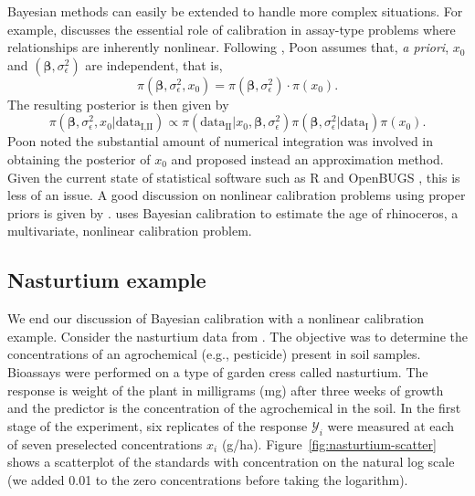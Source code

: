 \documentclass[cmfont,usenames,dvipsnames,leqno]{afit-etd}\usepackage[]{graphicx}\usepackage[]{color}
\newcommand{\mc}[1]{\ensuremath{\mathcal{#1}}}
\begin{document}
Bayesian methods can easily be extended to handle more complex situations. For example, \citet{racine-poon_bayesian_1988} discusses the essential role of calibration in assay-type problems where relationships are inherently nonlinear. Following \citet{hoadley_bayesian_1970}, Poon assumes that, \textit{a priori}, $x_0$ and $(\bm{\beta}, \sigma_\epsilon^2)$ are independent, that is,
\begin{equation*}
  \pi\left(\bm{\beta}, \sigma_\epsilon^2, x_0\right) = \pi\left(\bm{\beta}, \sigma_\epsilon^2\right) \cdot \pi\left(x_0\right).
\end{equation*}
The resulting posterior is then given by
\begin{equation*}
  \pi\left(\bm{\beta}, \sigma_\epsilon^2, x_0|\text{data}_{\text{I}, \text{II}}\right) \propto \pi\left(\text{data}_\text{II}|x_0, \bm{\beta}, \sigma_\epsilon^2\right)\pi\left(\bm{\beta}, \sigma_\epsilon^2|\text{data}_\text{I}\right)\pi\left(x_0\right).
\end{equation*}
Poon noted the substantial amount of numerical integration was involved in obtaining the posterior of $x_0$ and proposed instead an approximation method. Given the current state of statistical software such as R \citep{rprogram} and OpenBUGS \citep{lunn_bugs_2009}, this is less of an issue. A good discussion on nonlinear calibration problems using proper priors is given by \citet{hamada_bayesian_2003}. \citet{plessis_bayesian_1996} uses Bayesian calibration to estimate the age of rhinoceros, a multivariate, nonlinear calibration problem. 

\subsection{Nasturtium example}
\label{sec:nasturtium}
We end our discussion of Bayesian calibration with a nonlinear calibration example. Consider the nasturtium data from \citet{racine-poon_bayesian_1988}. The objective was to determine the concentrations of an agrochemical (e.g., pesticide) present in soil samples. Bioassays were performed on a type of garden cress called nasturtium. The response is weight of the plant in milligrams (mg) after three weeks of growth and the predictor is the concentration of the agrochemical in the soil. In the first stage of the experiment, six replicates of the response $\mc{Y}_i$ were measured at each of seven preselected concentrations $x_i$ (g/ha). Figure~\ref{fig:nasturtium-scatter} shows a scatterplot of the standards with concentration on the natural log scale (we added 0.01 to the zero concentrations before taking the logarithm). 
\end{document}
